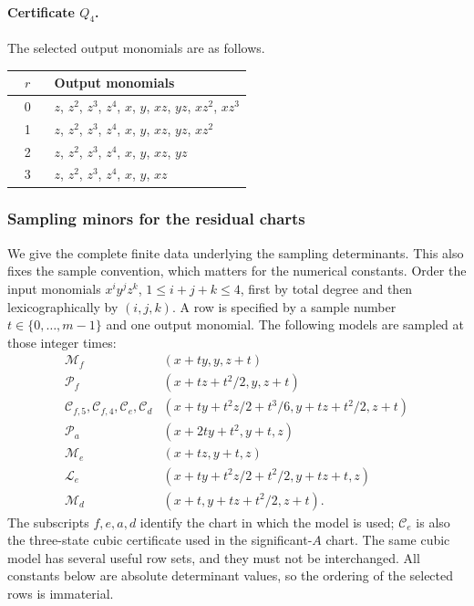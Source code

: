 \documentclass[11pt]{amsart}
\theoremstyle{definition}
\theoremstyle{remark}
\numberwithin{equation}{section}
\begin{document}
\paragraph{Certificate $Q_4$.} The selected output monomials are as follows.
\begin{center}
\begin{tabular}{cp{0.83\linewidth}}
$r$ & Output monomials\\\hline
0 & \(z\), \(z^{2}\), \(z^{3}\), \(z^{4}\), \(x\), \(y\), \(xz\), \(yz\), \(xz^{2}\), \(xz^{3}\)\\
1 & \(z\), \(z^{2}\), \(z^{3}\), \(z^{4}\), \(x\), \(y\), \(xz\), \(yz\), \(xz^{2}\)\\
2 & \(z\), \(z^{2}\), \(z^{3}\), \(z^{4}\), \(x\), \(y\), \(xz\), \(yz\)\\
3 & \(z\), \(z^{2}\), \(z^{3}\), \(z^{4}\), \(x\), \(y\), \(xz\)\\
\end{tabular}
\end{center}

\subsubsection{Sampling minors for the residual charts}\label{low:4:rr:certificates}
We give the complete finite data underlying the sampling determinants. This also fixes the sample convention, which matters for the numerical constants. Order the input monomials $x^iy^jz^k$, $1\le i+j+k\le4$, first by total degree and then lexicographically by $(i,j,k)$. A row is specified by a sample number $t\in\{0,\ldots,m-1\}$ and one output monomial. The following models are sampled at those integer times:
\[
\begin{array}{c|l}
\mathcal M_f &(x+t y,y,z+t)\\
\mathcal P_f &(x+t z+t^2/2,y,z+t)\\
\mathcal C_{f,5},\mathcal C_{f,4},\mathcal C_e,\mathcal C_d &(x+t y+t^2z/2+t^3/6,y+t z+t^2/2,z+t)\\
\mathcal P_a &(x+2t y+t^2,y+t,z)\\
\mathcal M_e &(x+t z,y+t,z)\\
\mathcal L_e &(x+t y+t^2z/2+t^2/2,y+t z+t,z)\\
\mathcal M_d &(x+t,y+t z+t^2/2,z+t).
\end{array}
\]
The subscripts $f,e,a,d$ identify the chart in which the model is used; $\mathcal C_e$ is also the three-state cubic certificate used in the significant-$A$ chart. The same cubic model has several useful row sets, and they must not be interchanged. All constants below are absolute determinant values, so the ordering of the selected rows is immaterial.
\end{document}
